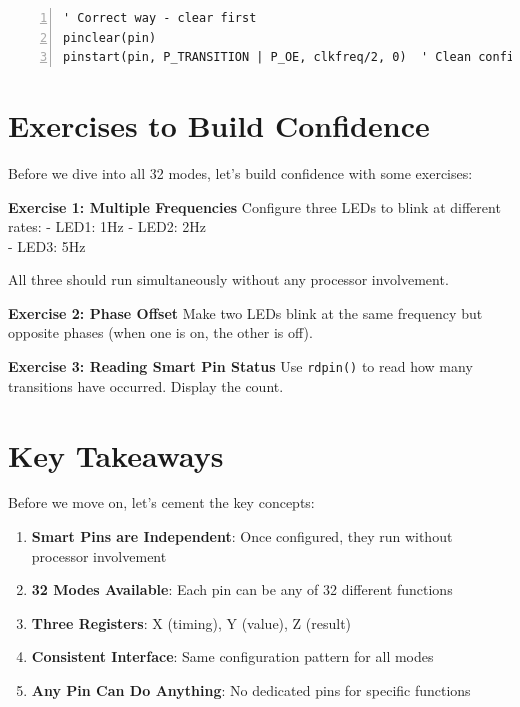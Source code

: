 \documentclass[11pt,a4paper,oneside,english]{book}
\begin{document}
\begin{Spin2Block}
\begin{Verbatim}[numbers=left,numbersep=5pt,xleftmargin=15pt]
' Correct way - clear first
pinclear(pin)
pinstart(pin, P_TRANSITION | P_OE, clkfreq/2, 0)  ' Clean configuration
\end{Verbatim}
\end{Spin2Block}

\hypertarget{exercises-to-build-confidence}{%
\section{Exercises to Build
Confidence}\label{exercises-to-build-confidence}}

Before we dive into all 32 modes, let's build confidence with some
exercises:

\textbf{Exercise 1: Multiple Frequencies} Configure three LEDs to blink
at different rates: - LED1: 1Hz - LED2: 2Hz\\
- LED3: 5Hz

All three should run simultaneously without any processor involvement.

\textbf{Exercise 2: Phase Offset} Make two LEDs blink at the same
frequency but opposite phases (when one is on, the other is off).

\textbf{Exercise 3: Reading Smart Pin Status} Use
\passthrough{\lstinline!rdpin()!} to read how many transitions have
occurred. Display the count.

\hypertarget{key-takeaways}{%
\section{Key Takeaways}\label{key-takeaways}}

Before we move on, let's cement the key concepts:

\begin{enumerate}
\def\labelenumi{\arabic{enumi}.}
\tightlist
\item
  \textbf{Smart Pins are Independent}: Once configured, they run without
  processor involvement
\item
  \textbf{32 Modes Available}: Each pin can be any of 32 different
  functions
\item
  \textbf{Three Registers}: X (timing), Y (value), Z (result)
\item
  \textbf{Consistent Interface}: Same configuration pattern for all
  modes
\item
  \textbf{Any Pin Can Do Anything}: No dedicated pins for specific
  functions
\end{enumerate}
\end{document}
